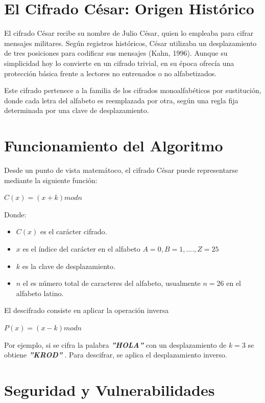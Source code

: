 \section{El Cifrado César: Origen Histórico}
El cifrado César recibe su nombre de Julio César, quien lo empleaba para cifrar mensajes militares. Según registros históricos, César utilizaba un desplazamiento de tres posiciones para codificar sus mensajes (Kahn, 1996). Aunque su simplicidad hoy lo convierte en un cifrado trivial, en su época ofrecía una protección básica frente a lectores no entrenados o no alfabetizados.

Este cifrado pertenece a la familia de los cifrados monoalfabéticos por sustitución, donde cada letra del alfabeto es reemplazada por otra, según una regla fija determinada por una clave de desplazamiento.

\section{Funcionamiento del Algoritmo}

Desde un punto de vista matemátoco, el cifrado César puede representarse mediante la siguiente función:

\centerline{\(C(x) = ( x + k ) mod n \)}

Donde:

\begin{itemize}
\item \(C(x)\) es el carácter cifrado.
\item \(x\) es el índice del carácter en el alfabeto \( A = 0, B = 1, ...., Z = 25\)
\item \(k \) es la clave de desplazamiento.
\item \(n\) el es número total de caracteres del alfabeto, usualmente  \(n = 26 \) en el alfabeto latino.
\end{itemize}

El descifrado consiste en aplicar la operación inversa 

\centerline{\(P(x) = ( x - k ) mod n \)}

Por ejemplo, si se cifra la palabra \textbf{\textit{''HOLA''}} con un desplazamiento de \(k = 3\) se obtiene \textbf{\textit{''KROD''}} . Para descifrar, se aplica el desplazamiento inverso. 

\section{Seguridad y Vulnerabilidades}

